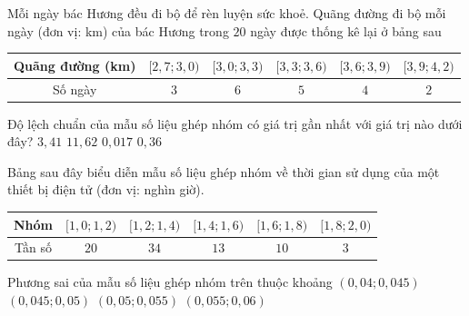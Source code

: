\begin{ex}%
	Mỗi ngày bác Hương đều đi bộ để rèn luyện sức khoẻ. Quãng đường đi bộ mỗi ngày (đơn vị: km) của bác Hương trong $20$ ngày được thống kê lại ở bảng  sau
	\begin{longtable}{|c|c|c|c|c|c|}
		 \hline
		Quãng đường (km) & $[2{,}7;3{,}0)$ & $[3{,}0;3{,}3)$ & $[3{,}3;3{,}6)$  & $[3{,}6;3{,}9)$ & $[3{,}9;4{,}2)$\\
		 \hline
		Số ngày & $3$ & $6$ & $5$ & $4$ &  $2$\\
		 \hline
	\end{longtable}
	Độ  lệch chuẩn của mẫu số liệu ghép nhóm có giá trị gần nhất với giá trị nào dưới đây?
	\choice 
		{$3{,}41$} 
		{$11{,}62$} 
		{$0{,}017$} 
		{\True $0{,}36$} 
\end{ex}

\begin{ex}%
	Bảng sau đây biểu diễn mẫu số  liệu ghép nhóm về thời gian sử dụng của một thiết bị điện tử (đơn vị: nghìn giờ).
	\begin{center}
		\begin{tabular}{|c|c|c|c|c|c|}
			\hline Nhóm & $[1{,}0; 1{,}2)$ &  $[1{,}2; 1{,}4)$ & $[1{,}4; 1{,}6)$ & $[1{,}6; 1{,}8)$ & $[1{,}8; 2{,}0)$ \\
			\hline Tần số & $20$ &  $34$ & $13$ & $10$ & $3$ \\
			 \hline
		\end{tabular}
	\end{center}
	Phương sai của  mẫu số liệu ghép nhóm trên thuộc khoảng
	\choice 
		 {$(0{,}04; 0{,}045)$}
		{\True  $(0{,}045; 0{,}05)$}
		 {$(0{,}05; 0{,}055)$}
		{$(0{,}055; 0{,}06)$} 
\end{ex}

